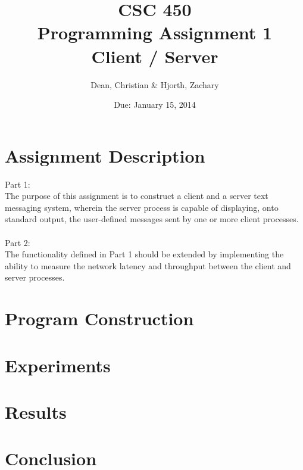 \documentclass[12pt]{article}
\begin{document}
\title{CSC 450\\
Programming Assignment 1\\
 Client / Server}
\author{Dean, Christian \& Hjorth, Zachary}
\date{Due: January 15, 2014}

\maketitle

\section{Assignment Description}

Part 1:\\

The purpose of this assignment is to construct a client and a server text messaging system, wherein the server process is capable of displaying, onto standard output, the user-defined messages sent by one or more client processes.
\\
\\
Part 2:\\

The functionality defined in Part 1 should be extended by implementing the ability to measure the network latency and throughput between the client and server processes.

\section{Program Construction}


\section{Experiments}


\section{Results}


\section{Conclusion}

\end{document}
